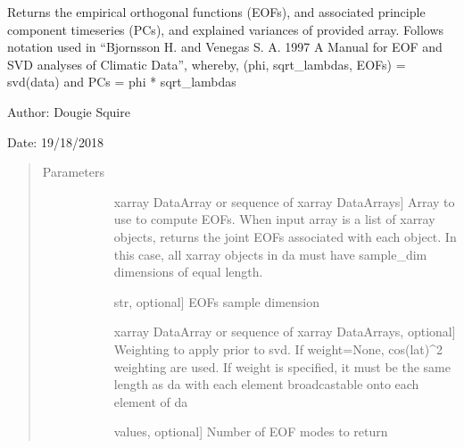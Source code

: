 \documentclass[letterpaper,10pt,english]{sphinxmanual}
\begin{document}
\begin{fulllineitems}
\label{\detokenize{diagnostic_doc:diagnostic.eofs}}
Returns the empirical orthogonal functions (EOFs), and associated principle component                 timeseries (PCs), and explained variances of provided array. Follows notation used in                 “Bjornsson H. and Venegas S. A. 1997 A Manual for EOF and SVD analyses of Climatic Data”,                 whereby, (phi, sqrt\_lambdas, EOFs) = svd(data) and PCs = phi * sqrt\_lambdas

\begin{DUlineblock}{0em}
\item[] Author: Dougie Squire
\item[] Date: 19/18/2018
\end{DUlineblock}
\begin{quote}\begin{description}
\item[{Parameters}] \leavevmode\begin{description}
\item[{}] \leavevmode{[}xarray DataArray or sequence of xarray DataArrays{]}
Array to use to compute EOFs. When input array is a list of xarray objects, returns the                     joint EOFs associated with each object. In this case, all xarray objects in da must have                     sample\_dim dimensions of equal length.

\item[{}] \leavevmode{[}str, optional{]}
EOFs sample dimension

\item[{}] \leavevmode{[}xarray DataArray or sequence of xarray DataArrays, optional{]}
Weighting to apply prior to svd. If weight=None, cos(lat)\textasciicircum{}2 weighting are used. If weight                     is specified, it must be the same length as da with each element broadcastable onto each                     element of da

\item[{}] \leavevmode{[}values, optional{]}
Number of EOF modes to return

\end{description}


\end{description}
\end{quote}
\end{fulllineitems}
\end{document}
